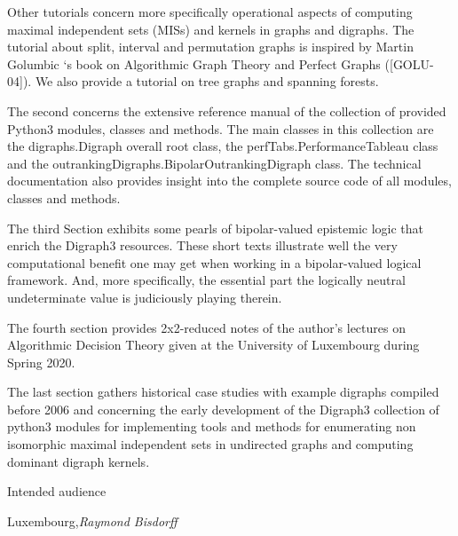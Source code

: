 Other tutorials concern more specifically operational aspects of computing maximal independent sets (MISs) and kernels in graphs and digraphs. The tutorial about split, interval and permutation graphs is inspired by Martin Golumbic ‘s book on Algorithmic Graph Theory and Perfect Graphs ([GOLU-04]). We also provide a tutorial on tree graphs and spanning forests.

The second  concerns the extensive reference manual of the collection of provided Python3 modules, classes and methods. The main classes in this collection are the digraphs.Digraph overall root class, the perfTabs.PerformanceTableau class and the outrankingDigraphs.BipolarOutrankingDigraph class. The technical documentation also provides insight into the complete source code of all modules, classes and methods.

The third Section exhibits some pearls of bipolar-valued epistemic logic that enrich the Digraph3 resources. These short texts illustrate well the very computational benefit one may get when working in a bipolar-valued logical framework. And, more specifically, the essential part the logically neutral undeterminate value is judiciously playing therein.

The fourth section provides 2x2-reduced notes of the author’s lectures on Algorithmic Decision Theory given at the University of Luxembourg during Spring 2020.

The last section gathers historical case studies with example digraphs compiled before 2006 and concerning the early development of the Digraph3 collection of python3 modules for implementing tools and methods for enumerating non isomorphic maximal independent sets in undirected graphs and computing dominant digraph kernels.

Intended audience

\vspace{\baselineskip}
\begin{flushright}\noindent
Luxembourg,\hfill {\it Raymond Bisdorff}\\
\end{flushright}


